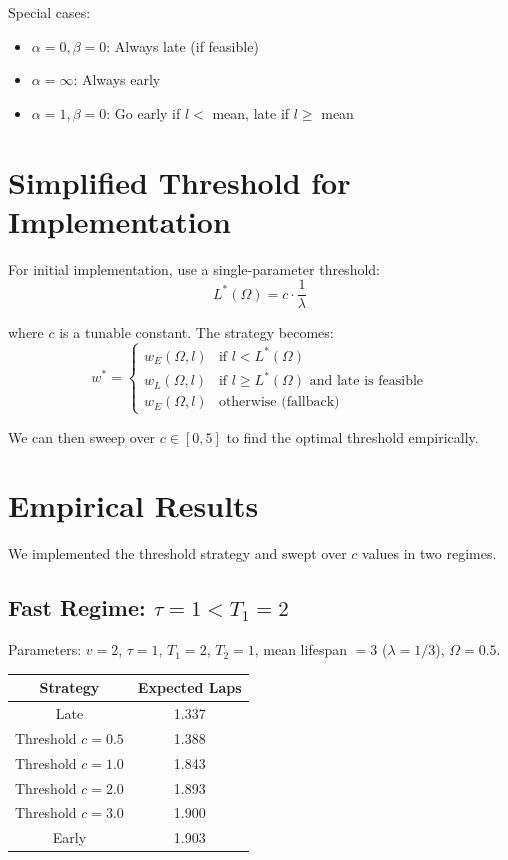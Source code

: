 \documentclass{article}
\begin{document}
Special cases:
\begin{itemize}
    \item $\alpha = 0, \beta = 0$: Always late (if feasible)
    \item $\alpha = \infty$: Always early
    \item $\alpha = 1, \beta = 0$: Go early if $l < $ mean, late if $l \geq$ mean
\end{itemize}

\section{Simplified Threshold for Implementation}

For initial implementation, use a single-parameter threshold:
\[
L^*(\Omega) = c \cdot \frac{1}{\lambda}
\]

where $c$ is a tunable constant. The strategy becomes:
\[
w^* = \begin{cases}
    w_E(\Omega, l) & \text{if } l < L^*(\Omega) \\
    w_L(\Omega, l) & \text{if } l \geq L^*(\Omega) \text{ and late is feasible} \\
    w_E(\Omega, l) & \text{otherwise (fallback)}
\end{cases}
\]

We can then sweep over $c \in [0, 5]$ to find the optimal threshold empirically.

\section{Empirical Results}

We implemented the threshold strategy and swept over $c$ values in two regimes.

\subsection{Fast Regime: $\tau = 1 < T_1 = 2$}

Parameters: $v = 2$, $\tau = 1$, $T_1 = 2$, $T_2 = 1$, mean lifespan $= 3$ ($\lambda = 1/3$), $\Omega = 0.5$.

\begin{center}
\begin{tabular}{|c|c|}
\hline
\textbf{Strategy} & \textbf{Expected Laps} \\
\hline
Late & 1.337 \\
Threshold $c = 0.5$ & 1.388 \\
Threshold $c = 1.0$ & 1.843 \\
Threshold $c = 2.0$ & 1.893 \\
Threshold $c = 3.0$ & 1.900 \\
Early & 1.903 \\
\hline
\end{tabular}
\end{center}
\end{document}
